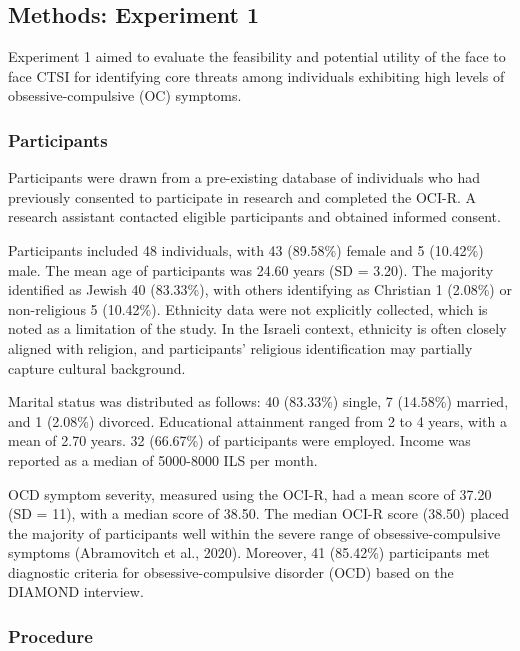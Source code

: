 \documentclass[
  man,floatsintext]{apa7}
\begin{document}
\subsection{Methods: Experiment 1}\label{methods-experiment-1}

Experiment 1 aimed to evaluate the feasibility and potential utility of the face to face CTSI for identifying core threats among individuals exhibiting high levels of obsessive-compulsive (OC) symptoms.

\subsubsection{Participants}\label{participants}

Participants were drawn from a pre-existing database of individuals who had previously consented to participate in research and completed the OCI-R.
A research assistant contacted eligible participants and obtained informed consent.

Participants included 48 individuals, with 43 (89.58\%) female and 5 (10.42\%) male.
The mean age of participants was 24.60 years (SD = 3.20).
The majority identified as Jewish 40 (83.33\%), with others identifying as Christian 1 (2.08\%) or non-religious 5 (10.42\%).
Ethnicity data were not explicitly collected, which is noted as a limitation of the study.
In the Israeli context, ethnicity is often closely aligned with religion, and participants' religious identification may partially capture cultural background.

Marital status was distributed as follows: 40 (83.33\%) single, 7 (14.58\%) married, and 1 (2.08\%) divorced.
Educational attainment ranged from 2 to 4 years, with a mean of 2.70 years.
32 (66.67\%) of participants were employed.
Income was reported as a median of 5000-8000 ILS per month.

OCD symptom severity, measured using the OCI-R, had a mean score of 37.20 (SD = 11), with a median score of 38.50.
The median OCI-R score (38.50) placed the majority of participants well within the severe range of obsessive-compulsive symptoms (Abramovitch et al., 2020).
Moreover, 41 (85.42\%) participants met diagnostic criteria for obsessive-compulsive disorder (OCD) based on the DIAMOND interview.

\subsubsection{Procedure}\label{procedure}
\end{document}
